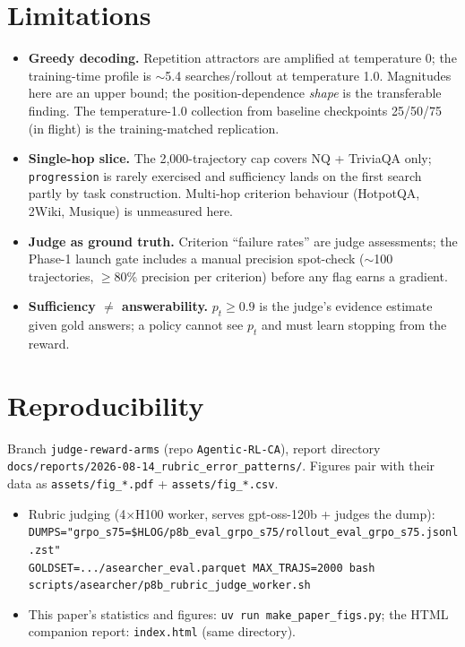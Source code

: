 \documentclass[10pt]{article}
\newcommand{\code}[1]{\texttt{\small #1}}
\begin{document}
\section{Limitations}
\begin{itemize}
\item \textbf{Greedy decoding.} Repetition attractors are amplified at temperature 0; the
training-time profile is $\sim$5.4 searches/rollout at temperature 1.0. Magnitudes here are an
upper bound; the position-dependence \emph{shape} is the transferable finding. The
temperature-1.0 collection from baseline checkpoints 25/50/75 (in flight) is the
training-matched replication.
\item \textbf{Single-hop slice.} The 2{,}000-trajectory cap covers NQ + TriviaQA only;
\code{progression} is rarely exercised and sufficiency lands on the first search partly by task
construction. Multi-hop criterion behaviour (HotpotQA, 2Wiki, Musique) is unmeasured here.
\item \textbf{Judge as ground truth.} Criterion ``failure rates'' are judge assessments; the
Phase-1 launch gate includes a manual precision spot-check ($\sim$100 trajectories,
$\geq$80\% precision per criterion) before any flag earns a gradient.
\item \textbf{Sufficiency $\neq$ answerability.} $p_t \geq 0.9$ is the judge's evidence
estimate given gold answers; a policy cannot see $p_t$ and must learn stopping from the reward.
\end{itemize}

\section{Reproducibility}
Branch \code{judge-reward-arms} (repo \code{Agentic-RL-CA}), report directory
\code{docs/reports/2026-08-14\_rubric\_error\_patterns/}. Figures pair with their data as
\code{assets/fig\_*.pdf} + \code{assets/fig\_*.csv}.
\begin{itemize}
\item Rubric judging (4$\times$H100 worker, serves gpt-oss-120b + judges the dump):\\
\code{DUMPS="grpo\_s75=\$HLOG/p8b\_eval\_grpo\_s75/rollout\_eval\_grpo\_s75.jsonl.zst"}\\
\code{GOLDSET=.../asearcher\_eval.parquet MAX\_TRAJS=2000 bash scripts/asearcher/p8b\_rubric\_judge\_worker.sh}
\item This paper's statistics and figures: \code{uv run make\_paper\_figs.py}; the HTML
companion report: \code{index.html} (same directory).
\end{itemize}
\end{document}
